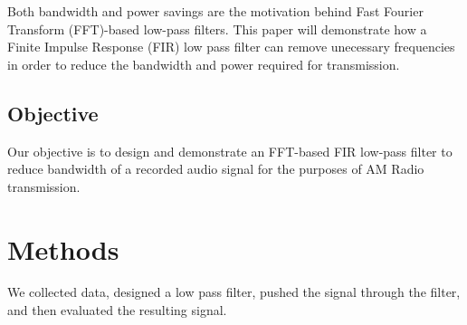 Both bandwidth and power savings are the motivation behind Fast Fourier Transform (FFT)-based low-pass filters.  This paper will demonstrate how a Finite Impulse Response (FIR) low pass filter can remove unecessary frequencies in order to reduce the bandwidth and power required for transmission.  

\subsection{Objective}
Our objective is to design and demonstrate an FFT-based FIR low-pass filter to reduce bandwidth of a recorded audio signal for the purposes of AM Radio transmission.

\section{Methods}
We collected data, designed a low pass filter, pushed the signal through the filter, and then evaluated the resulting signal.









